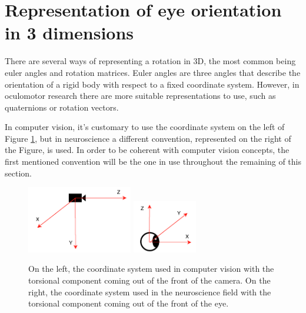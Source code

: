 \section{Representation of eye orientation in 3 dimensions}
\label{cha2:represent}
There are several ways of representing a rotation in 3D, the most common being euler angles and rotation matrices. Euler angles are three angles that describe the orientation of a rigid body with respect to a fixed coordinate system. However, in oculomotor research there are more suitable representations to use, such as quaternions or rotation vectors. \cite{rep}\cite{mathrot}

In computer vision, it's customary to use the coordinate system on the left of Figure \ref{cha2:sec2:fig:coordsys2}, but in neuroscience a different convention, represented on the right of the Figure, is used. In order to be coherent with computer vision concepts, the first mentioned convention will be the one in use throughout the remaining of this section.

\begin{figure}[!htb]
	\centering
		\includegraphics[width=0.41\textwidth]{images/cvcoordinatesys.pdf}
		\includegraphics[width=0.25\textwidth]{images/cvcoordinatesysq.pdf}
		\caption[Computer Vision vs Neuroscience coordinate systems]{On the left, the coordinate system used in computer vision with the torsional component coming out of the front of the camera. On the right, the coordinate system used in the neuroscience field with the torsional component coming out of the front of the eye.}
		\label{cha2:sec2:fig:coordsys2}
\end{figure}

